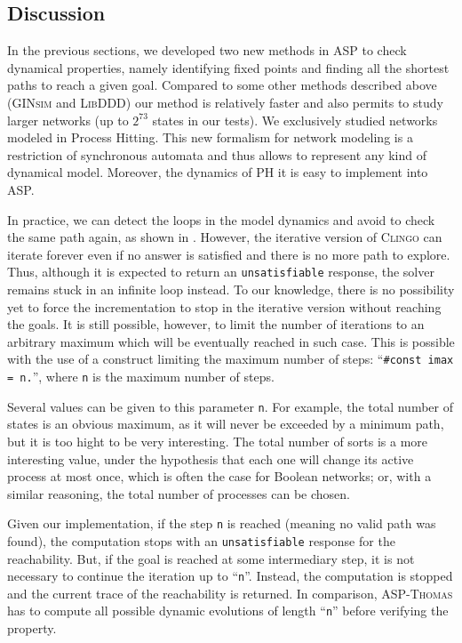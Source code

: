\subsection{Discussion}
\label{sec:discussion}

In the previous sections,
we developed two new methods in ASP to check dynamical properties,
namely identifying fixed points and finding all the shortest paths to reach a given goal.
Compared to some other methods described above
(\textsc{GINsim} and \textsc{LibDDD}) our method is relatively faster and also permits to study larger networks
(up to $2^{73}$ states in our tests). We exclusively studied networks modeled in Process Hitting. This new formalism for network modeling is a restriction of synchronous automata and thus allows to represent any kind of dynamical model. Moreover, the dynamics of PH it is easy to implement into ASP.

In practice, we can detect the loops in the model dynamics and avoid to check the same path again, as shown in .
However, the iterative version of \textsc{Clingo} can iterate forever even if no answer is satisfied and there is no more path to explore.
Thus, although it is expected to return an \texttt{unsatisfiable} response, the solver remains stuck in an infinite loop instead.
To our knowledge, there is no possibility yet to force the incrementation to stop in the iterative version without reaching the goals.
It is still possible, however, to limit the number of iterations to an arbitrary
maximum which will be eventually reached in such case.
This is possible with the use of a construct limiting the maximum number of steps: ``\texttt{\#const imax = n.}'',
where \texttt{n} is the maximum number of steps.

Several values can be given to this parameter \texttt{n}.
For example, the total number of states is an obvious maximum,
as it will never be exceeded by a minimum path,
but it is too hight to be very interesting.
The total number of sorts is a more interesting value,
under the hypothesis that each one will change its active process at most once,
which is often the case for Boolean networks;
or, with a similar reasoning, the total number of processes can be chosen.

Given our implementation, if the step \texttt{n} is reached (meaning no valid path was found),
the computation stops with an \texttt{unsatisfiable} response for the reachability.
But, if the goal is reached at some intermediary step, it is not necessary to continue the iteration up to ``\texttt{n}''.
Instead, the computation is stopped and the current trace of the reachability is returned.
In comparison, \textsc{ASP-Thomas} has to compute all possible dynamic evolutions of length ``\texttt{n}'' before verifying the property.
